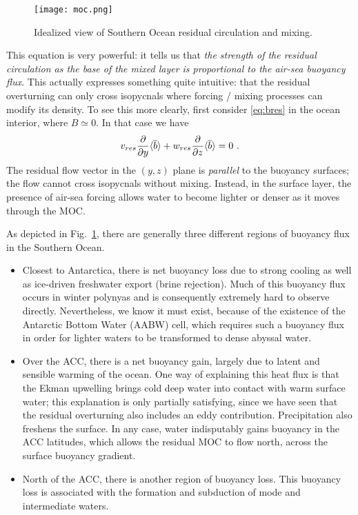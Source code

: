 \documentclass[12pt]{article}
\newcommand{\pd}[2]{ \frac{\partial #1}{\partial #2} }
\newcommand{\ab}[1]{\ensuremath{\langle #1 \rangle}}
\newcommand{\ol}{\ensuremath{\overline}}
\begin{document}
\begin{figure}[htbp]
\begin{center}
\texttt{[image: moc.png]}
\caption{Idealized view of Southern Ocean residual circulation and mixing.}
\label{fig:cartoon_side}
\end{center}
\end{figure}

This equation is very powerful: it tells us that {\em the strength of the residual circulation as the base of the mixed layer is proportional to the air-sea buoyancy flux}. This actually expresses something quite intuitive: that the residual overturning can only cross isopycnals where forcing / mixing processes can modify its density. To see this more clearly, first consider \eqref{eq:bres} in the ocean interior, where $B \simeq 0$. In that case we have
\begin{equation}
v_{res} \pd{}{y} \ab{\ol{b}} + w_{res} \pd{}{z} \ab{\ol{b}} = 0 \ .
\end{equation}
The residual flow vector in the $(y, z)$ plane is {\em parallel} to the buoyancy surfaces; the flow cannot cross isopycnals without mixing. Instead, in the surface layer, the presence of air-sea forcing allows water to become lighter or denser as it moves through the MOC.

As depicted in Fig.~\ref{fig:cartoon_side}, there are generally three different regions of buoyancy flux in the Southern Ocean.
\begin{itemize}
\item Closest to Antarctica, there is net buoyancy loss due to strong cooling as well as ice-driven freshwater export (brine rejection). Much of this buoyancy flux occurs in winter polynyas and is consequently extremely hard to observe directly. Nevertheless, we know it must exist, because of the existence of the Antarctic Bottom Water (AABW) cell, which requires such a buoyancy flux in order for lighter waters to be transformed to dense abyssal water.
\item Over the ACC, there is a net buoyancy gain, largely due to latent and sensible warming of the ocean. One way of explaining this heat flux is that the Ekman upwelling brings cold deep water into contact with warm surface water; this explanation is only partially satisfying, since we have seen that the residual overturning also includes an eddy contribution. Precipitation also freshens the surface. In any case, water indisputably gains buoyancy in the ACC latitudes, which allows the residual MOC to flow north, across the surface buoyancy gradient.
\item North of the ACC, there is another region of buoyancy loss. This buoyancy loss is associated with the formation and subduction of mode and intermediate waters.
\end{itemize}

%





\end{document}
